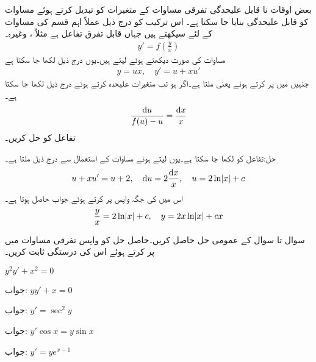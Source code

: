 بعض اوقات نا قابل علیحدگی تفرقی مساوات کے متغیرات کو تبدیل کرتے ہوئے مساوات کو قابل علیحدگی بنایا جا سکتا ہے۔ اس ترکیب کو درج ذیل عملاً اہم قسم کی مساوات کے لئے سیکھتے ہیں جہاں  قابل تفرق تفاعل ہے مثلاً ،  وغیرہ۔
\begin{align}
y'=f\left(\frac{y}{x}\right)
\end{align}  
مساوات کی صورت دیکھتے ہوئے  لیتے ہیں۔یوں درج ذیل لکھا جا سکتا ہے
\begin{align}\label{مساوات_سادہ_اول_جامع_علیحدگی_الف}
y=ux,\quad y'=u+xu'
\end{align}
جنہیں  میں پر کرتے ہوئے  یعنی  ملتا ہے۔اگر  ہو تب متغیرات علیحدہ کرتے ہوئے درج ذیل لکھا جا سکتا ہے۔
\begin{align} 
\frac{\dif u}{f(u)-u}=\frac{\dif x}{x}
\end{align}
تفاعل  کو حل کریں۔

حل:تفاعل کو  لکھا جا سکتا ہے۔یوں  لیتے ہوئے  مساوات  کے استعمال سے درج ذیل ملتا ہے۔
\begin{align*}
u+xu'=u+2, \quad \dif u=2\frac{\dif x}{x},\quad u=2\ln \abs{x}+c
\end{align*}
اس میں  کی جگہ واپس  پر کرتے ہوئے جواب حاصل ہوتا ہے۔
\begin{align*}
\frac{y}{x}=2\ln \abs{x}+c,\quad y=2x\ln \abs{x}+cx
\end{align*}

سوال  تا سوال  کے عمومی حل حاصل کریں۔حاصل حل کو واپس تفرقی مساوات میں پر کرتے ہوئے اس کی درستگی ثابت کریں۔

$y^2y'+x^2=0$

جواب:
$yy'+x=0$

جواب:
$y'=\sec^2 y$

جواب:
$y'\cos x=y\sin x$

جواب:
$y'=ye^{x-1}$

